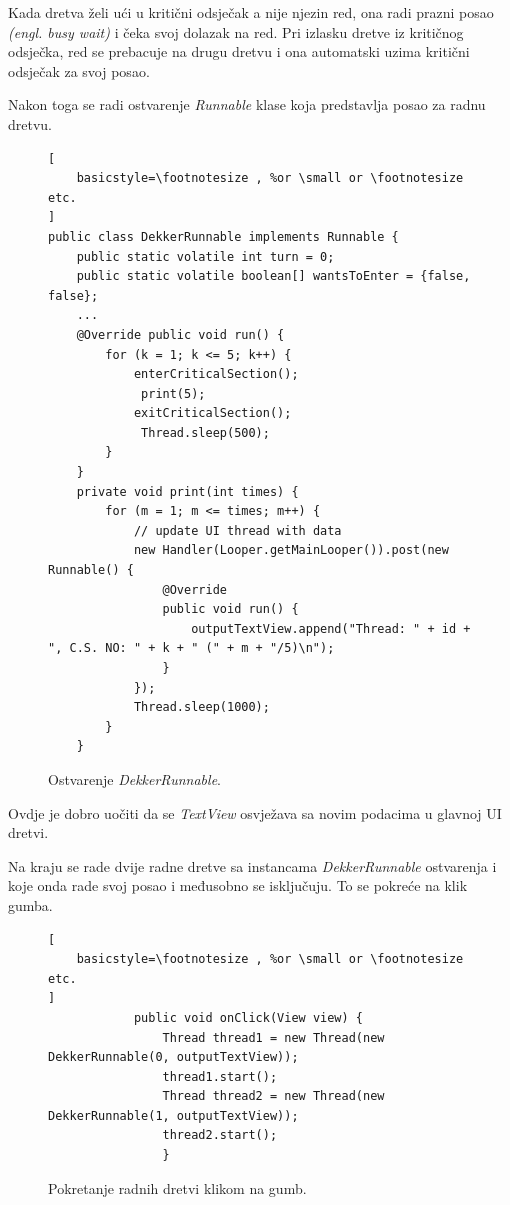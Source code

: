 \documentclass[times, utf8, zavrsni]{fer}
\begin{document}
Kada dretva želi ući u kritični odsječak a nije njezin red, ona radi prazni posao \textit{(engl. busy wait)} i čeka svoj dolazak na red. Pri izlasku dretve iz kritičnog odsječka, red se prebacuje na drugu dretvu i ona automatski uzima kritični odsječak za svoj posao.\newpage

Nakon toga se radi ostvarenje \textit{Runnable} klase koja predstavlja posao za radnu dretvu.

\begin{figure}[ht!]
\begin{lstlisting}[
    basicstyle=\footnotesize , %or \small or \footnotesize etc.
]
public class DekkerRunnable implements Runnable {
    public static volatile int turn = 0;
    public static volatile boolean[] wantsToEnter = {false, false};
    ...
    @Override public void run() {
        for (k = 1; k <= 5; k++) {
            enterCriticalSection();
             print(5);
            exitCriticalSection();
             Thread.sleep(500);
        }
    }
    private void print(int times) {
        for (m = 1; m <= times; m++) {
            // update UI thread with data
            new Handler(Looper.getMainLooper()).post(new Runnable() {
                @Override
                public void run() {
                    outputTextView.append("Thread: " + id + ", C.S. NO: " + k + " (" + m + "/5)\n");
                }
            });
            Thread.sleep(1000);
        }
    }

\end{lstlisting}
\caption{Ostvarenje \textit{DekkerRunnable}.}
\label{overflow}
\end{figure}

Ovdje je dobro uočiti da se \textit{TextView} osvježava sa novim podacima u glavnoj UI dretvi.\newpage

Na kraju se rade dvije radne dretve sa instancama \textit{DekkerRunnable} ostvarenja i koje onda rade svoj posao i međusobno se isključuju. To se pokreće na klik gumba.

\begin{figure}[ht!]
\begin{lstlisting}[
    basicstyle=\footnotesize , %or \small or \footnotesize etc.
]
            public void onClick(View view) {
                Thread thread1 = new Thread(new DekkerRunnable(0, outputTextView));
                thread1.start();
                Thread thread2 = new Thread(new DekkerRunnable(1, outputTextView));
                thread2.start();
				}
\end{lstlisting}
\caption{Pokretanje radnih dretvi klikom na gumb.}
\label{overflow}
\end{figure}
\end{document}
